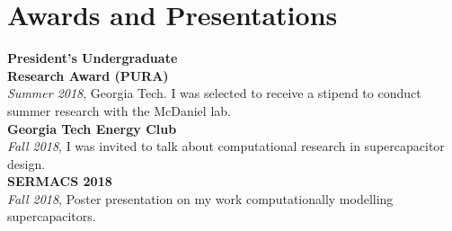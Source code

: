 \documentclass{tccv}
\begin{document}
\begin{minipage}[t]{0.35\textwidth}
    \section{Awards and Presentations}
    
    \textbf{President's Undergraduate \\ Research Award (PURA)} \\
    \emph{Summer 2018}, Georgia Tech. I was selected to receive a stipend to conduct summer research with the McDaniel lab. \\
    
    \textbf{Georgia Tech Energy Club} \\
    \emph{Fall 2018}, I was invited to talk about computational research in supercapacitor design. \\
    
    \textbf{SERMACS 2018} \\
    \emph{Fall 2018}, Poster presentation on my work computationally modelling supercapacitors.
\end{minipage}
\begin{minipage}[t]{0.3\textwidth}
\end{minipage}
\end{document}
